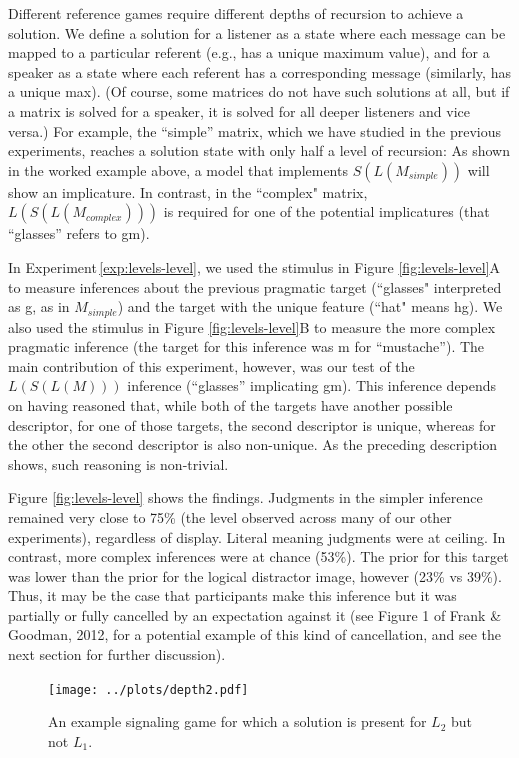 \documentclass[man,noapacite]{apa2}
\newcounter{Experiment}
\newcommand{\exptref}[1]{Experiment\,\ref{#1}}
\begin{document}
Different reference games require different depths of recursion to achieve a solution. We define a solution for a listener as a state where each message can be mapped to a particular referent (e.g., has a unique maximum value), and for a speaker as a state where each referent has a corresponding message (similarly, has a unique max). (Of course, some matrices do not have such solutions at all, but if a matrix is solved for a speaker, it is solved for all deeper listeners and vice versa.) For example, the ``simple'' matrix, which we have studied in the previous experiments, reaches a solution state with only half a level of recursion: As shown in the worked example above, a model that implements $S(L(M_{simple}))$ will show an implicature. In contrast, in the ``complex" matrix, $L(S(L(M_{complex})))$ is required for one of the potential implicatures (that ``glasses'' refers to {\sc gm}).

In \exptref{exp:levels-level}, we used the stimulus in Figure \ref{fig:levels-level}A to measure inferences about the previous pragmatic target (``glasses" interpreted as {\sc g}, as in $M_{simple}$) and the target with the unique feature (``hat" means {\sc hg}). We also used the stimulus in Figure \ref{fig:levels-level}B to measure the more complex pragmatic inference (the target for this inference was {\sc m} for ``mustache''). The main contribution of this experiment, however, was our test of the $L(S(L(M)))$ inference (``glasses'' implicating {\sc gm}). This inference depends on having reasoned that, while both of the targets have another possible descriptor, for one of those targets, the second descriptor is unique, whereas for the other the second descriptor is also non-unique. As the preceding description shows, such reasoning is non-trivial.

Figure \ref{fig:levels-level} shows the findings. Judgments in the simpler inference remained very close to 75\% (the level observed across many of our other experiments), regardless of display. Literal meaning judgments were at ceiling. In contrast, more complex inferences were at chance (53\%). The prior for this target was lower than the prior for the logical distractor image, however (23\% vs 39\%). Thus, it may be the case that participants make this inference but it was partially or fully cancelled  by an expectation against it (see Figure 1 of Frank \& Goodman, 2012, for a potential example of this kind of cancellation, and see the next section for further discussion).

 \begin{figure}[t]
  \centering
  \texttt{[image: ../plots/depth2.pdf]}
  \caption{\label{fig:really-hard} An example signaling game for which a solution is present for $L_2$ but not $L_1$.}
\end{figure}
\end{document}
